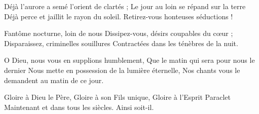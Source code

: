 Déjà l'aurore a semé l'orient de clartés ;
Le jour au loin se répand sur la terre
Déjà perce et jaillit le rayon du soleil.
Retirez-vous honteuses séductions !

Fantôme nocturne, loin de nous
Dissipez-vous, désirs coupables du cœur ;
Disparaissez, criminelles souillures
Contractées dans les ténèbres de la nuit.

O Dieu, nous vous en supplions humblement,
Que le matin qui sera pour nous le dernier
Nous mette en possession de la lumière éternelle,
Nos chants vous le demandent au matin de ce jour.

Gloire à Dieu le Père,
Gloire à son Fils unique,
Gloire à l'Esprit Paraclet
Maintenant et dans tous les siècles.
Ainsi soit-il.